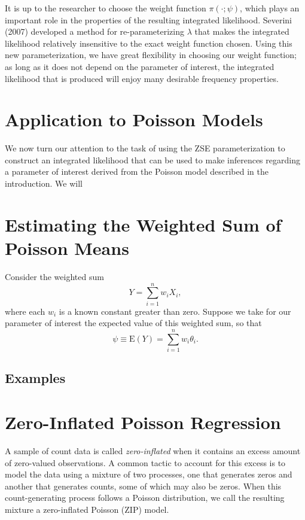 \documentclass[
  12pt]{article}
\begin{document}
It is up to the researcher to choose the weight function
\(\pi(\cdot; \psi)\), which plays an important role in the properties of
the resulting integrated likelihood. Severini (2007) developed a method
for re-parameterizing \(\lambda\) that makes the integrated likelihood
relatively insensitive to the exact weight function chosen. Using this
new parameterization, we have great flexibility in choosing our weight
function; as long as it does not depend on the parameter of interest,
the integrated likelihood that is produced will enjoy many desirable
frequency properties.

\section{Application to Poisson
Models}\label{application-to-poisson-models}

We now turn our attention to the task of using the ZSE parameterization
to construct an integrated likelihood that can be used to make
inferences regarding a parameter of interest derived from the Poisson
model described in the introduction. We will

\section{Estimating the Weighted Sum of Poisson
Means}\label{estimating-the-weighted-sum-of-poisson-means}

Consider the weighted sum \[Y = \sum_{i=1}^n w_iX_i,\] where each
\(w_i\) is a known constant greater than zero. Suppose we take for our
parameter of interest the expected value of this weighted sum, so that
\[\psi \equiv \text{E}(Y) = \sum_{i=1}^n w_i\theta_i.\]

\subsection{Examples}\label{examples}

\section{Zero-Inflated Poisson
Regression}\label{zero-inflated-poisson-regression}

A sample of count data is called \emph{zero-inflated} when it contains
an excess amount of zero-valued observations. A common tactic to account
for this excess is to model the data using a mixture of two processes,
one that generates zeros and another that generates counts, some of
which may also be zeros. When this count-generating process follows a
Poisson distribution, we call the resulting mixture a zero-inflated
Poisson (ZIP) model.
\end{document}

